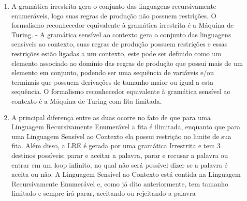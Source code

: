 \documentclass{article}
\begin{document}
    \begin{solution}
        \begin{enumerate}[label=(\alph*)]
            \item A gramática irrestrita gera o conjunto das linguagens recursivamente enumeráveis, logo suas regras de produção não
            possuem restrições. O formalismo reconhecedor equivalente à
            gramática irrestrita é a Máquina de Turing. - A gramática sensível
            ao contexto gera o conjunto das linguagens sensíveis ao contexto,
            suas regras de produção possuem restrições e essas restrições
            estão ligadas a um contexto, este pode ser definido como um
            elemento associado ao domínio das regras de produção que possui
            mais de um elemento em conjunto, podendo ser uma sequência de
            variáveis e/ou terminais que possuem derivações de tamanho maior
            ou igual a esta sequência. O formalismo reconhecedor equivalente à
            gramática sensível ao contexto é a Máquina de Turing com fita
            limitada.
            
            \item A principal diferença entre as duas ocorre no fato de que para uma Linguagem
            Recursivamente Enumerável a fita é ilimitada, enquanto que para uma Linguagem Sensível
            ao Contexto ela possui restrição no limite de sua fita. Além disso, a LRE é gerada por uma
            gramática Irrestrita e tem 3 destinos possíveis: parar e aceitar a palavra, parar e recusar a
            palavra ou entrar em um loop infinito, no qual não será possível dizer se a palavra é aceita
            ou não. A Linguagem Sensível ao Contexto está contida na Linguagem Recursivamente
            Enumerável e, como já dito anteriormente, tem tamanho limitado e sempre irá parar,
            aceitando ou rejeitando a palavra
        \end{enumerate}
    \end{solution}
\end{document}

